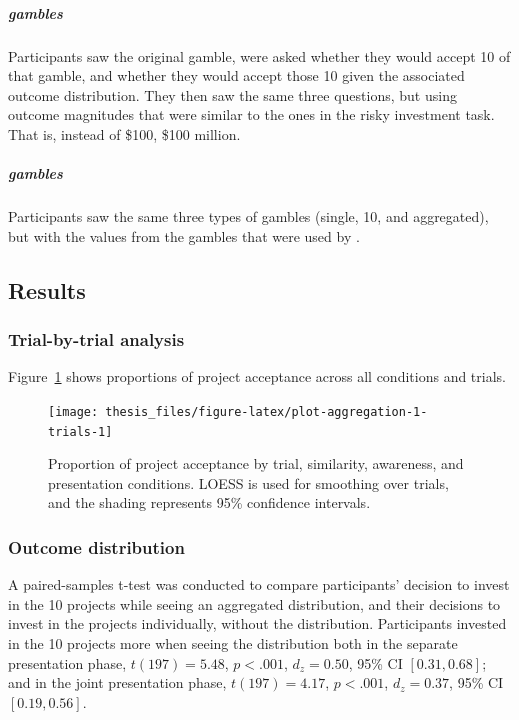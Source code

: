 \documentclass[a4paper, nobind, dvipsnames]{templates/ociamthesis}
\theoremstyle{definition}
\theoremstyle{definition}
\theoremstyle{definition}
\theoremstyle{definition}
\theoremstyle{remark}
\begin{document}
\subparagraph{\texorpdfstring{\textcite{samuelson1963} gambles}{Samuelson (1963) gambles}}

Participants saw the original \textcite{samuelson1963} gamble, were asked whether they
would accept 10 of that gamble, and whether they would accept those 10 given the
associated outcome distribution. They then saw the same three questions, but
using outcome magnitudes that were similar to the ones in the risky investment
task. That is, instead of \$100, \$100 million.

\subparagraph{\texorpdfstring{\textcite{redelmeier1992} gambles}{Redelmeier \& Tversky (1992) gambles}}

Participants saw the same three types of gambles (single, 10, and aggregated),
but with the values from the gambles that were used by \textcite{redelmeier1992}.

\hypertarget{results-aggregation-1-appendix}{%
\subsection{Results}\label{results-aggregation-1-appendix}}

\hypertarget{trial-by-trial-aggregation-1}{%
\subsubsection{Trial-by-trial analysis}\label{trial-by-trial-aggregation-1}}

Figure~\ref{fig:plot-aggregation-1-trials} shows proportions of project
acceptance across all conditions and trials.



\begin{figure}
\texttt{[image: thesis\_files/figure-latex/plot-aggregation-1-trials-1]} \caption{Proportion of project acceptance by trial, similarity, awareness, and presentation conditions. LOESS is used for smoothing over trials, and the shading represents 95\% confidence intervals.}\label{fig:plot-aggregation-1-trials}
\end{figure}

\hypertarget{outcome-distribution-aggregation-1}{%
\subsubsection{Outcome distribution}\label{outcome-distribution-aggregation-1}}

A paired-samples t-test was conducted to compare participants' decision to
invest in the 10 projects while seeing an aggregated distribution, and their
decisions to invest in the projects individually, without the distribution.
Participants invested in the 10 projects more when seeing the distribution both
in the separate presentation phase,
\(t(197) = 5.48\), \(p < .001\), \(d_z = 0.50\), 95\% CI \([0.31, 0.68]\); and in the joint
presentation phase, \(t(197) = 4.17\), \(p < .001\), \(d_z = 0.37\), 95\% CI \([0.19, 0.56]\).
\end{document}
